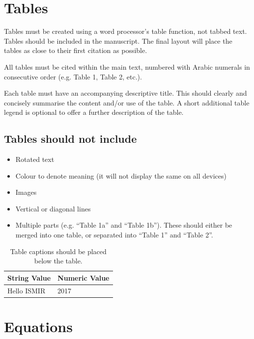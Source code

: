 \documentclass{article}
\begin{document}
\section{Tables}\label{sec:tables}

Tables must be created using a word processor's table function,
not tabbed text.
Tables should be included in the manuscript.
The final layout will place the tables as close to their first
citation as possible.

All tables must be cited within the main text, numbered with Arabic
numerals in consecutive order (e.g. Table 1, Table 2, etc.).

Each table must have an accompanying descriptive title.
This should clearly and concisely summarise the content and/or
use of the table.
A short additional table legend is optional to offer a further
description of the table.

\subsection{Tables should not include}

\begin{itemize}
  \item Rotated text
  \item Colour to denote meaning (it will not display the same on all devices)
  \item Images
  \item Vertical or diagonal lines
  \item Multiple parts (e.g. ``Table 1a'' and ``Table 1b'').
        These should either be merged into one table,
        or separated into ``Table 1'' and ``Table 2''.
\end{itemize}

\begin{table}[htpb]
  \centering
  \begin{tabular}{ll}
    \toprule
    \bfseries String Value & \bfseries Numeric Value \\ \midrule
    Hello ISMIR            & 2017                    \\
    \bottomrule
  \end{tabular}
  \caption{Table captions should be placed below the table.}
  \label{tab:table}
\end{table}

\section{Equations}\label{sec:equations}
\end{document}
